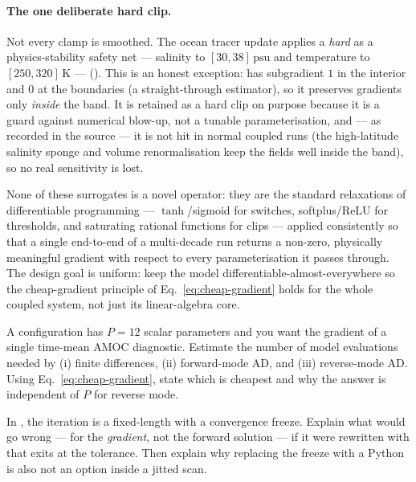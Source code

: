 \paragraph{The one deliberate hard clip.} Not every clamp is smoothed. The ocean tracer update
applies a \emph{hard}  as a physics-stability safety net --- salinity to
$[30,38]\,\mathrm{psu}$ and temperature to $[250,320]\,\mathrm{K}$ ---
(). This is
an honest exception:  has subgradient $1$ in the interior and $0$ at the boundaries
(a straight-through estimator), so it preserves gradients only \emph{inside} the band. It is
retained as a hard clip on purpose because it is a guard against numerical blow-up, not a tunable
parameterisation, and --- as recorded in the source --- it is not hit in normal coupled runs (the
high-latitude salinity sponge and volume renormalisation keep the fields well inside the band), so
no real sensitivity is lost.

\begin{remark}
None of these surrogates is a novel operator: they are the standard relaxations of
differentiable programming --- $\tanh$/sigmoid for switches, softplus/ReLU for thresholds, and
saturating rational functions for clips --- applied consistently so that a single
end-to-end  of a multi-decade run returns a non-zero, physically meaningful gradient
with respect to every parameterisation it passes through. The design goal is uniform: keep the model
differentiable-almost-everywhere so the cheap-gradient principle of Eq.~\eqref{eq:cheap-gradient}
holds for the whole coupled system, not just its linear-algebra core.
\end{remark}

\begin{exercise}
A configuration has $P=12$ scalar parameters and you want the gradient of a single time-mean AMOC
diagnostic. Estimate the number of model evaluations needed by (i) finite differences, (ii)
forward-mode AD, and (iii) reverse-mode AD. Using Eq.~\eqref{eq:cheap-gradient}, state which is
cheapest and why the answer is independent of $P$ for reverse mode.
\end{exercise}

\begin{exercise}
In , the iteration is a fixed-length
 with a  convergence freeze. Explain what would go wrong --- for the
\emph{gradient}, not the forward solution --- if it were rewritten with  that
exits at the tolerance. Then explain why replacing the  freeze with a Python
 is also not an option inside a jitted scan.
\end{exercise}

